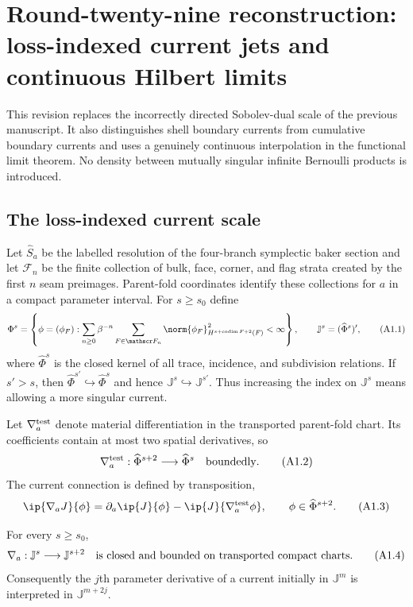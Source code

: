 \section{Round-twenty-nine reconstruction: loss-indexed current jets and continuous Hilbert limits}
\label{sec:r29-a1}

This revision replaces the incorrectly directed Sobolev-dual scale of the
previous manuscript.  It also distinguishes shell boundary currents from
cumulative boundary currents and uses a genuinely continuous interpolation
in the functional limit theorem.  No density between mutually singular
infinite Bernoulli products is introduced.

\subsection{The loss-indexed current scale}

Let $\widehat S_a$ be the labelled resolution of the four-branch symplectic
baker section and let $\mathscr F_n$ be the finite collection of bulk, face,
corner, and flag strata created by the first $n$ seam preimages.  Parent-fold
coordinates identify these collections for $a$ in a compact parameter
interval.  For $s\ge s_0$ define
\[
 \Phi^s=\left\{\phi=(\phi_F):
   \sum_{n\ge0}\beta^{-n}\sum_{F\in\mathscr F_n}
   \norm{\phi_F}_{H^{s+\operatorname{codim}F+2}(F)}^2<\infty\right\},
 \qquad \mathbb J^s=(\widehat\Phi^s)',                    \tag{A1.1}
\]
where $\widehat\Phi^s$ is the closed kernel of all trace, incidence, and
subdivision relations.  If $s'>s$, then
$\widehat\Phi^{s'}\hookrightarrow\widehat\Phi^s$ and hence
$\mathbb J^s\hookrightarrow\mathbb J^{s'}$.  Thus increasing the index on
$\mathbb J^s$ means allowing a more singular current.

Let $\nabla_a^{\rm test}$ denote material differentiation in the transported
parent-fold chart.  Its coefficients contain at most two spatial derivatives,
so
\[
 \nabla_a^{\rm test}:\widehat\Phi^{s+2}\longrightarrow\widehat\Phi^s
 \quad\hbox{boundedly}.                                  \tag{A1.2}
\]
The current connection is defined by transposition,
\[
 \ip{\nabla_a J}{\phi}
 =\partial_a\ip{J}{\phi}-\ip{J}{\nabla_a^{\rm test}\phi},
 \qquad \phi\in\widehat\Phi^{s+2}.                       \tag{A1.3}
\]

\begin{lemma}
\label{lem:r29-a1-direction}
For every $s\ge s_0$,
\[
 \nabla_a:\mathbb J^s\longrightarrow\mathbb J^{s+2}
 \quad\hbox{is closed and bounded on transported compact charts}.       \tag{A1.4}
\]
Consequently the $j$th parameter derivative of a current initially in
$\mathbb J^m$ is interpreted in $\mathbb J^{m+2j}$.
\end{lemma}


